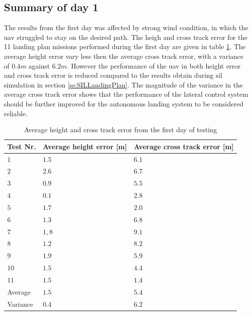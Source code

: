 \subsection{Summary of day 1}\label{sss:summaryDay1}
The results from the first day was affected by strong wind condition, in which the \gls{uav} struggled to stay on the desired path. The heigh and cross track error for the 11 landing plan missions performed during the first day are given in table \ref{tb:Day1HeightCrossTrack}. The average height error vary less then the average cross track error, with a variance of $0.4 m$ against $6.2 m$. However the performance of the \gls{uav} in both height error and cross track error is reduced compared to the results obtain during \gls{sil} simulation in section \ref{ss:SILLandingPlan}. The magnitude of the variance in the average cross track error shows that the performance of the lateral control system should be further improved for the autonomous landing system to be considered reliable.
\begin{table}[H]
\centering
\begin{tabular}{| l | l | l |}
\hline
\textbf{Test Nr.} 	& \textbf{Average height error [m]} 	& \textbf{Average cross track error [m]}  \\ \hline
$1$				& $1.5$							& $6.1$								\\ \hline
$2$				& $2.6$							& $6.7$								\\ \hline
$3$				& $0.9$							& $5.5$								\\ \hline
$4$				& $0.1$							& $2.8$								\\ \hline
$5$				& $1.7$							& $2.0$								\\ \hline
$6$				& $1.3$							& $6.8$								\\ \hline
$7$				& $1,8$							& $9.1$								\\ \hline
$8$				& $1.2$							& $8.2$								\\ \hline
$9$				& $1.9$							& $5.9$								\\ \hline
$10$			& $1.5$							& $4.4$								\\ \hline
$11$			& $1.5$							& $1.4$								\\ \hline \hline
Average			& $1.5$							& $5.4$								\\ \hline
Variance		& $0.4$							& $6.2$								\\ \hline
\end{tabular}
\caption{Average height and cross track error from the first day of testing}
\label{tb:Day1HeightCrossTrack}
\end{table}
